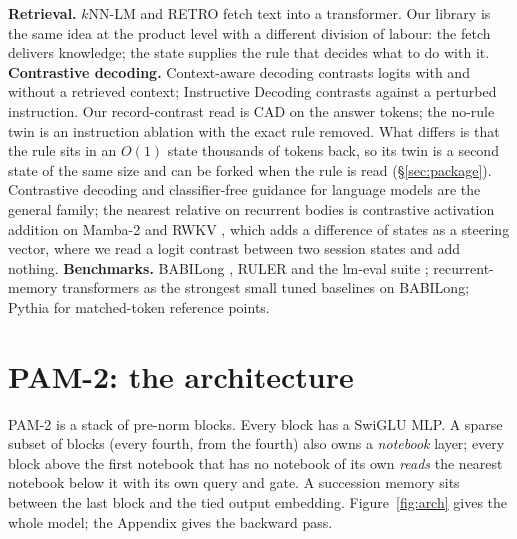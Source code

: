 \documentclass[11pt]{article}
\newcommand{\arch}{PAM-2}
\newcommand{\mamba}{Mamba-2}
\begin{document}
\textbf{Retrieval.} $k$NN-LM \citep{khandelwal2020knnlm} and RETRO \citep{borgeaud2022retro} fetch text into a transformer. Our library is the same idea at the product level with a different division of labour: the fetch delivers knowledge; the state supplies the rule that decides what to do with it.
\textbf{Contrastive decoding.} Context-aware decoding \citep{shi2023cad} contrasts logits with and without a retrieved context; Instructive Decoding \citep{kim2024instructive} contrasts against a perturbed instruction. Our record-contrast read is CAD on the answer tokens; the no-rule twin is an instruction ablation with the exact rule removed. What differs is that the rule sits in an $O(1)$ state thousands of tokens back, so its twin is a second state of the same size and can be forked when the rule is read (\S\ref{sec:package}). Contrastive decoding \citep{li2022contrastive} and classifier-free guidance for language models \citep{sanchez2023cfg} are the general family; the nearest relative on recurrent bodies is contrastive activation addition on \mamba{} and RWKV \citep{paulo2024rnn}, which adds a difference of states as a steering vector, where we read a logit contrast between two session states and add nothing.
\textbf{Benchmarks.} BABILong \citep{kuratov2024babilong}, RULER \citep{hsieh2024ruler} and the lm-eval suite \citep{gao2023lmeval}; recurrent-memory transformers \citep{bulatov2022rmt} as the strongest small tuned baselines on BABILong; Pythia \citep{biderman2023pythia} for matched-token reference points.

\section{\arch: the architecture}
\label{sec:arch}
\arch{} is a stack of pre-norm blocks. Every block has a SwiGLU MLP. A sparse subset of blocks (every fourth, from the fourth) also owns a \emph{notebook} layer; every block above the first notebook that has no notebook of its own \emph{reads} the nearest notebook below it with its own query and gate. A succession memory sits between the last block and the tied output embedding. Figure~\ref{fig:arch} gives the whole model; the Appendix gives the backward pass.
\end{document}
